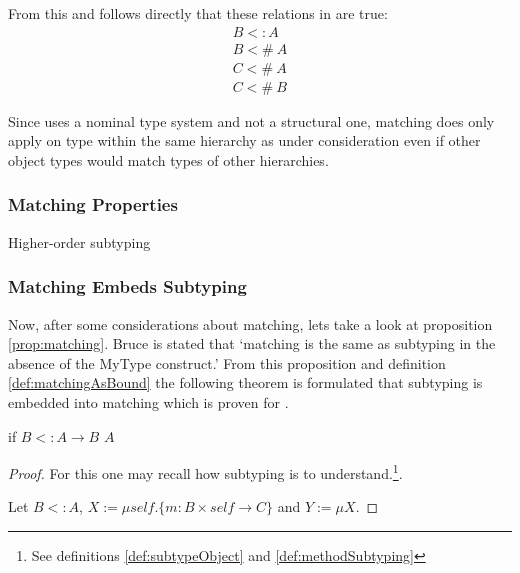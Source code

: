 From this and  follows directly that these
relations in  are true:
\begin{align}
B <: A \\
B <\!\!\#~A \label{alg:match} \\
C <\!\!\#~A \\
C <\!\!\#~B
\end{align}

Since \ooplss uses a nominal type system and not a structural one,
matching does only apply on type within the same hierarchy as under
consideration even if other object types would match types of other
hierarchies.

\subsubsection{Matching Properties}
Higher-order subtyping

\subsubsection{Matching Embeds Subtyping}
Now, after some considerations about matching, lets take a look at
proposition \ref{prop:matching}. Bruce is stated that `matching is
the same as subtyping in the absence of the MyType construct.' From
this proposition and definition \ref{def:matchingAsBound} the following
theorem is formulated that subtyping is embedded into matching which is
proven for \ooplss.

\begin{prop}
	\label{prop:matchinIsSubtyping}
	if $B <: A \rightarrow B$ \match $A$
\end{prop}

\begin{proof}
	For this one may recall how subtyping is to understand.\footnote{See
	definitions \ref{def:subtypeObject} and \ref{def:methodSubtyping}}.

	Let $B <: A$, $X := \mu self.\{m :
	B \times self \rightarrow C \} $ and $Y := \mu X.  $

%
\end{proof}

